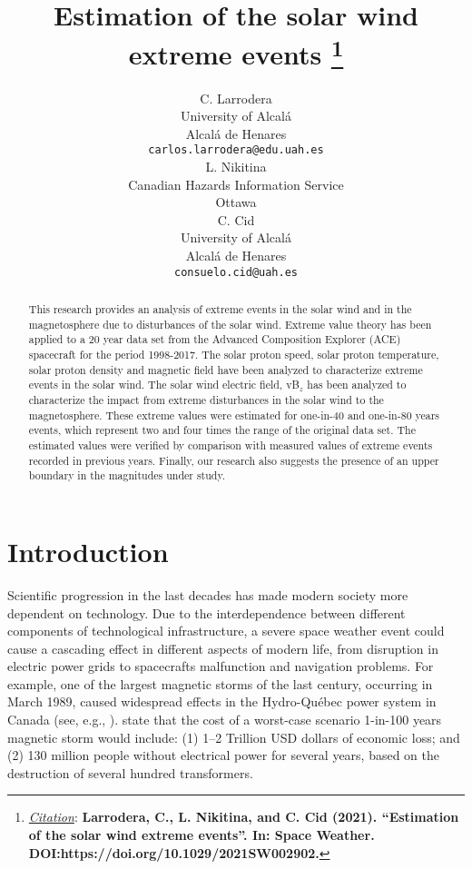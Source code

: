 \documentclass{article}
\title{Estimation of the solar wind extreme events
\thanks{\textit{\underline{Citation}}: 
\textbf{Larrodera, C., L. Nikitina, and C. Cid (2021). “Estimation of the solar wind extreme events”.
In: Space Weather. DOI:https://doi.org/10.1029/2021SW002902.}} 
}
\author{
  C. Larrodera \\
  University of Alcalá \\
  Alcalá de Henares\\
  \texttt{carlos.larrodera@edu.uah.es} \\
  \And
 L. Nikitina \\
  Canadian Hazards Information Service \\
  Ottawa\\
  \And
  C. Cid \\
  University of Alcalá \\
  Alcalá de Henares\\
  \texttt{consuelo.cid@uah.es} \\
}
\begin{document}
\maketitle


\begin{abstract}
This research provides an analysis of extreme events in the solar wind and in the magnetosphere due to disturbances of the solar wind.
Extreme value theory has been applied to a 20 year data set from the Advanced Composition Explorer (ACE) spacecraft for the period 1998-2017. The solar proton speed, solar proton temperature, solar proton density and magnetic field have been analyzed to characterize extreme events in the solar wind. The solar wind electric field, vB$_{z}$ has been analyzed to characterize the impact from extreme disturbances in the solar wind to the magnetosphere. These extreme values were estimated for one-in-40 and one-in-80 years events, which represent two and four times the range of the original data set. The estimated values were verified by comparison with measured values of extreme events recorded in previous years. Finally, our research also suggests the presence of an upper boundary in the magnitudes under study.
\end{abstract}



\section{Introduction}

Scientific progression in the last decades has made modern society more dependent on technology. Due to the interdependence between different components of technological infrastructure, a severe space weather event could cause a cascading effect in different aspects of modern life, from disruption in electric power grids to spacecrafts malfunction and navigation problems. For example, one of the largest magnetic storms of the last century, occurring in March 1989, caused widespread effects in the Hydro-Québec power system in Canada (see, e.g., \cite{Boteler_2019_Space_weather}).
\cite{Riley_2018_Extreme_Space_Events} state that the cost of a worst-case scenario 1-in-100 years magnetic storm would include: (1) 1–2 Trillion USD dollars of economic loss; and (2) 130 million people without electrical power for several years, based on the destruction of several hundred transformers. 
\end{document}
